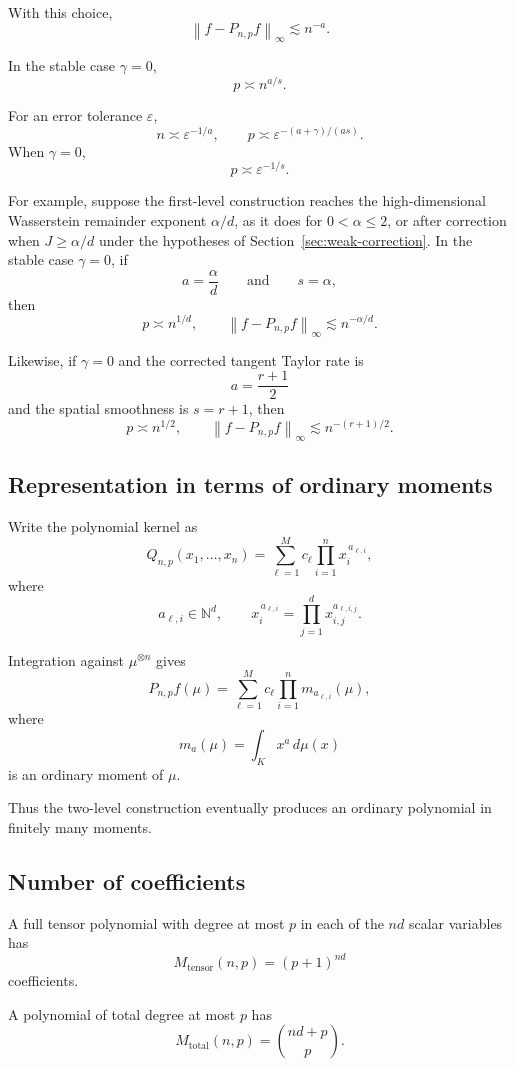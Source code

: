 \documentclass[11pt]{article}
\newcommand{\norm}[1]{\left\lVert #1\right\rVert}
\begin{document}
With this choice,
\[
\boxed{
\norm{f-P_{n,p}f}_\infty
\lesssim n^{-a}.
}
\]

In the stable case \(\gamma=0\),
\[
p\asymp n^{a/s}.
\]

For an error tolerance \(\varepsilon\),
\[
n\asymp\varepsilon^{-1/a},
\qquad
p\asymp
\varepsilon^{-(a+\gamma)/(as)}.
\]
When \(\gamma=0\),
\[
p\asymp\varepsilon^{-1/s}.
\]

For example, suppose the first-level construction reaches the
high-dimensional Wasserstein remainder exponent \(\alpha/d\), as it
does for \(0<\alpha\leq2\), or after correction when
\(J\geq\alpha/d\) under the hypotheses of
Section~\ref{sec:weak-correction}. In the stable case \(\gamma=0\), if
\[
a=\frac{\alpha}{d}
\qquad\text{and}\qquad
s=\alpha,
\]
then
\[
\boxed{
p\asymp n^{1/d},
\qquad
\norm{f-P_{n,p}f}_\infty
\lesssim n^{-\alpha/d}.
}
\]

Likewise, if \(\gamma=0\) and the corrected tangent Taylor rate is
\[
a=\frac{r+1}{2}
\]
and the spatial smoothness is \(s=r+1\), then
\[
\boxed{
p\asymp n^{1/2},
\qquad
\norm{f-P_{n,p}f}_\infty
\lesssim n^{-(r+1)/2}.
}
\]

\subsection{Representation in terms of ordinary moments}

Write the polynomial kernel as
\[
Q_{n,p}(x_1,\ldots,x_n)
=
\sum_{\ell=1}^M
c_\ell
\prod_{i=1}^n x_i^{\,a_{\ell,i}},
\]
where
\[
a_{\ell,i}\in\mathbb N^d,
\qquad
x_i^{\,a_{\ell,i}}
=
\prod_{j=1}^d x_{i,j}^{a_{\ell,i,j}}.
\]

Integration against \(\mu^{\otimes n}\) gives
\[
P_{n,p}f(\mu)
=
\sum_{\ell=1}^M
c_\ell
\prod_{i=1}^n
m_{a_{\ell,i}}(\mu),
\]
where
\[
m_a(\mu)=\int_K x^a\,d\mu(x)
\]
is an ordinary moment of \(\mu\).

Thus the two-level construction eventually produces an ordinary
polynomial in finitely many moments.

\subsection{Number of coefficients}

A full tensor polynomial with degree at most \(p\) in each of the
\(nd\) scalar variables has
\[
\boxed{
M_{\mathrm{tensor}}(n,p)
=
(p+1)^{nd}
}
\]
coefficients.

A polynomial of total degree at most \(p\) has
\[
\boxed{
M_{\mathrm{total}}(n,p)
=
\binom{nd+p}{p}.
}
\]
\end{document}
